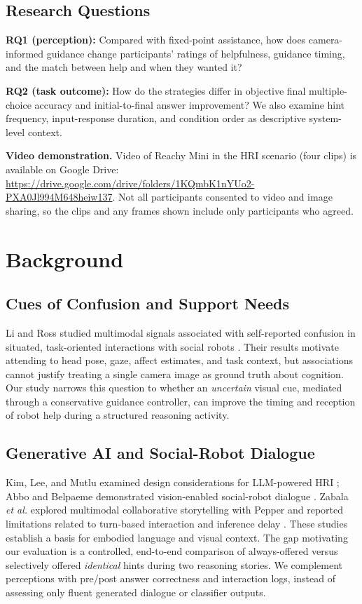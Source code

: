 \documentclass[conference]{IEEEtran}
\begin{document}
\subsection{Research Questions}
\noindent\textbf{RQ1 (perception):} Compared with fixed-point assistance, how does camera-informed guidance change participants' ratings of helpfulness, guidance timing, and the match between help and when they wanted it?

\noindent\textbf{RQ2 (task outcome):} How do the strategies differ in objective final multiple-choice accuracy and initial-to-final answer improvement? We also examine hint frequency, input-response duration, and condition order as descriptive system-level context.

\noindent\textbf{Video demonstration.} Video of Reachy Mini in the HRI scenario (four clips) is available on Google Drive: \url{https://drive.google.com/drive/folders/1KQmbK1nYUo2-PXA0Jl994M648heiw137}. Not all participants consented to video and image sharing, so the clips and any frames shown include only participants who agreed.

\section{Background}
\subsection{Cues of Confusion and Support Needs}
Li and Ross studied multimodal signals associated with self-reported confusion in situated, task-oriented interactions with social robots \cite{li2023hmm,li2023invoking}. Their results motivate attending to head pose, gaze, affect estimates, and task context, but associations cannot justify treating a single camera image as ground truth about cognition. Our study narrows this question to whether an \emph{uncertain} visual cue, mediated through a conservative guidance controller, can improve the timing and reception of robot help during a structured reasoning activity.

\subsection{Generative AI and Social-Robot Dialogue}
Kim, Lee, and Mutlu examined design considerations for LLM-powered HRI \cite{kim2024understanding}; Abbo and Belpaeme demonstrated vision-enabled social-robot dialogue \cite{abbo2025blind}. Zabala \emph{et al.} explored multimodal collaborative storytelling with Pepper and reported limitations related to turn-based interaction and inference delay \cite{zabala2025storytelling}. These studies establish a basis for embodied language and visual context. The gap motivating our evaluation is a controlled, end-to-end comparison of always-offered versus selectively offered \emph{identical} hints during two reasoning stories. We complement perceptions with pre/post answer correctness and interaction logs, instead of assessing only fluent generated dialogue or classifier outputs.
\end{document}
